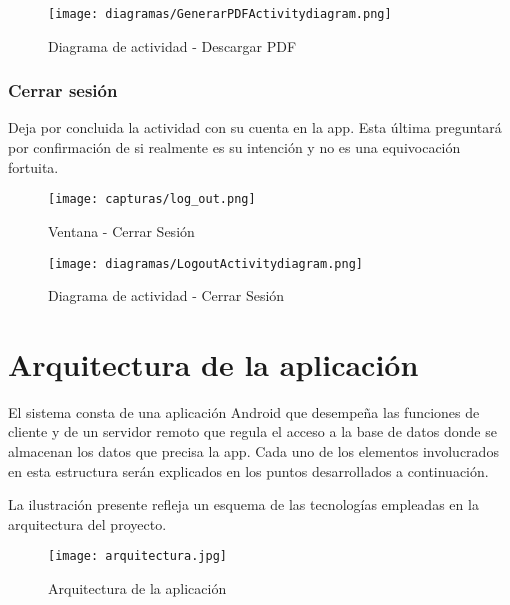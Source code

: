 \documentclass[11pt,spanish,
		listoftables,listoffigures]
		{tfgplantilla}
\begin{document}
\begin{figure}[H]
\centering
\texttt{[image: diagramas/GenerarPDFActivitydiagram.png]}
\caption{Diagrama de actividad - Descargar PDF}
\end{figure}

\newpage
\subsection {Cerrar sesión}

Deja por concluida la actividad con su cuenta en la app. Esta última preguntará por confirmación de si realmente es su intención y no es una equivocación fortuita.

\begin{figure}[H]
\centering
\texttt{[image: capturas/log\_out.png]}
\caption{Ventana - Cerrar Sesión}
\end{figure}

\begin{figure}[H]
\centering
\texttt{[image: diagramas/LogoutActivitydiagram.png]}
\caption{Diagrama de actividad -  Cerrar Sesión}
\end{figure}


\chapter{Arquitectura de la aplicaci\'on}

El sistema consta de una aplicación Android que desempeña las funciones de cliente y de un servidor remoto que regula el acceso a la base de datos donde se almacenan los datos que precisa la app. Cada uno de los elementos involucrados en esta estructura serán explicados en los puntos desarrollados a continuación.

La ilustración presente refleja un esquema de las tecnologías empleadas en la arquitectura del proyecto.

\begin{figure}[H]
\centering
\texttt{[image: arquitectura.jpg]}
\caption{Arquitectura de la aplicación}
\end{figure}

\end{document}
